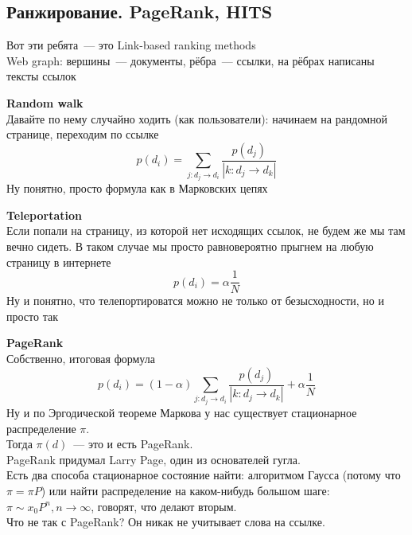 \documentclass[12pt]{article}
\begin{document}
  \subsection{Ранжирование. PageRank, HITS}
    Вот эти ребята~--- это Link-based ranking methods\\
    Web graph: вершины~--- документы, рёбра~--- ссылки, на рёбрах написаны тексты ссылок

    \smallskip\smallskip
    {\bf Random walk}\\
    Давайте по нему случайно ходить (как пользователи): начинаем на рандомной странице, переходим по ссылке
    $$p(d_i) = \sum\limits_{j: d_j \to d_i} \frac{p(d_j)}{|k: d_j \to d_k|}$$
    Ну понятно, просто формула как в Марковских цепях

    \smallskip\smallskip
    {\bf Teleportation}\\
    Если попали на страницу, из которой нет исходящих ссылок, не будем же мы там вечно сидеть. В таком случае мы просто равновероятно прыгнем на любую страницу в интернете
    $$p(d_i) = \alpha \frac{1}{N}$$
    Ну и понятно, что телепортироватся можно не только от безысходности, но и просто так

    \smallskip\smallskip
    {\bf PageRank}\\
    Собственно, итоговая формула
    $$p(d_i) = (1 - \alpha) \sum\limits_{j: d_j \to d_i} \frac{p(d_j)}{|k: d_j \to d_k|} + \alpha \frac{1}{N}$$
    Ну и по Эргодической теореме Маркова у нас существует стационарное распределение $\pi$.\\
    Тогда $\pi(d)$~--- это и есть PageRank.\\
    PageRank придумал Larry Page, один из основателей гугла.\\
    Есть два способа стационарное состояние найти: алгоритмом Гаусса (потому что $\pi = \pi P$) или найти распределение на каком-нибудь большом шаге: $\pi \sim x_0 P^{n}, n \to \infty$, говорят, что делают вторым.\\
    Что не так с PageRank? Он никак не учитывает слова на ссылке.
\end{document}
